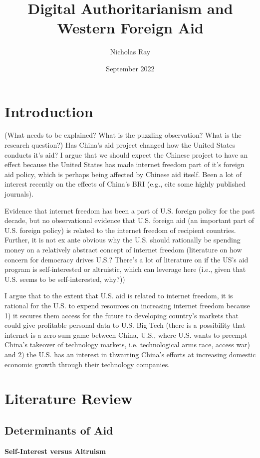 \documentclass{article}
\title{Digital Authoritarianism and Western Foreign Aid}
\author{Nicholas Ray}
\date{September 2022}
\begin{document}
\maketitle
\section*{Introduction}
(What needs to be explained? What is the puzzling observation? What is the research question?)
Has China's aid project changed how the United States conducts it's aid? I argue that we should expect the Chinese project to have an effect because the United States has made internet freedom part of it's foreign aid policy, which is perhaps being affected by Chinese aid itself. Been a lot of interest recently on the effects of China's BRI (e.g., cite some highly published journals).

Evidence that internet freedom has been a part of U.S. foreign policy for the past decade, but no observational evidence that U.S. foreign aid (an important part of U.S. foreign policy) is related to the internet freedom of recipient countries. Further, it is not ex ante obvious why the U.S. should rationally be spending money on a relatively abstract concept of internet freedom (literature on how concern for democracy drives U.S.? There's a lot of literature on if the US's aid program is self-interested or altruistic, which can leverage here (i.e., given that U.S. seems to be self-interested, why?))

I argue that to the extent that U.S. aid is related to internet freedom, it is rational for the U.S. to expend resources on increasing internet freedom because 1) it secures them access for the future to developing country's markets that could give profitable personal data to U.S. Big Tech (there is a possibility that internet is a zero-sum game between China, U.S., where U.S. wants to preempt China's takeover of technology markets, i.e. technological arms race, access war) and 2) the U.S. has an interest in thwarting China's efforts at increasing domestic economic growth through their technology companies.

\section*{Literature Review}
\subsection*{Determinants of Aid}
\textbf{Self-Interest versus Altruism}
\end{document}
